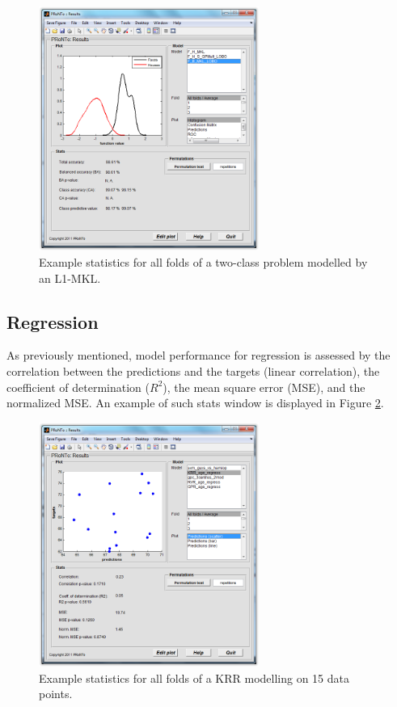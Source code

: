 \begin{figure}[h!]
\begin{center}
\includegraphics[height=8cm]{images/prt_ui_results_statsTable.png}
\caption{Example statistics for all folds of a two-class problem modelled by an L1-MKL.}
\label{fig_prt_ui_results_statsTable}
\end{center}
\end{figure}

\subsection{Regression}

As previously mentioned, model performance for regression is assessed by the correlation between the predictions and the targets (linear correlation), the coefficient of determination ($R^2$), the mean square error (MSE), and the normalized MSE. An example of such stats window is displayed in Figure \ref{fig_prt_ui_results_statsTableReg}.

\begin{figure}[h!]
\begin{center}
\includegraphics[height=8cm]{images/prt_ui_results_statsTableReg.PNG}
\caption{Example statistics for all folds of a KRR modelling on 15 data points.}
\label{fig_prt_ui_results_statsTableReg}
\end{center}
\end{figure}


